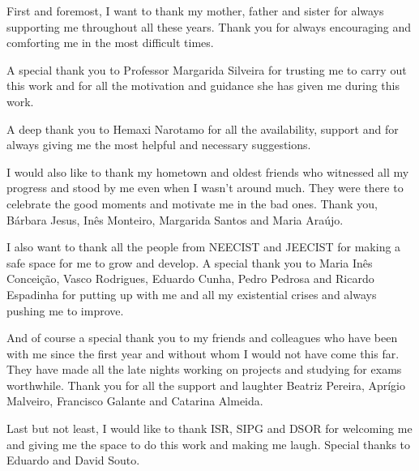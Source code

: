 
First and foremost, I want to thank my mother, father and sister for always supporting me throughout all these years. Thank you for always encouraging and comforting me in the most difficult times.

A special thank you to Professor Margarida Silveira for trusting me to carry out this work and for all the motivation and guidance she has given me during this work. 

A deep thank you to Hemaxi Narotamo for all the availability, support and for always giving me the most helpful and necessary suggestions.

I would also like to thank my hometown and oldest friends who witnessed all my progress and stood by me even when I wasn't around much. They were there to celebrate the good moments and motivate me in the bad ones. Thank you, Bárbara Jesus, Inês Monteiro, Margarida Santos and Maria Araújo.

I also want to thank all the people from NEECIST and JEECIST for making a safe space for me to grow and develop. A special thank you to Maria Inês Conceição, Vasco Rodrigues, Eduardo Cunha, Pedro Pedrosa and Ricardo Espadinha for putting up with me and all my existential crises and always pushing me to improve.

And of course a special thank you to my friends and colleagues who have been with me since the first year and without whom I would not have come this far. They have made all the late nights working on projects and studying for exams worthwhile. Thank you for all the support and laughter Beatriz Pereira, Aprígio Malveiro, Francisco Galante and Catarina Almeida.

Last but not least, I would like to thank ISR, SIPG and DSOR for welcoming me and giving me the space to do this work and making me laugh. Special thanks to Eduardo and David Souto.